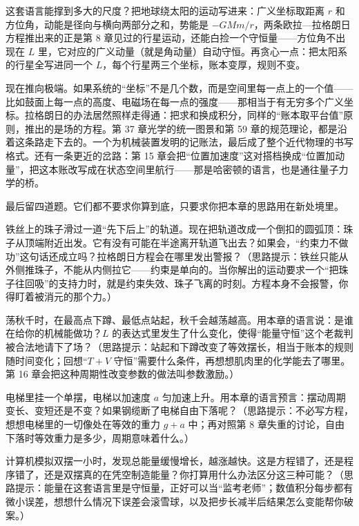 
\begin{thought}
这套语言能撑到多大的尺度？把地球绕太阳的运动写进来：广义坐标取距离 \(r\) 和方位角，动能是径向与横向两部分之和，势能是 \(-GMm/r\)，两条欧拉—拉格朗日方程推出来的正是第 8 章见过的行星运动，还能白捡一个守恒量——方位角不出现在 \(L\) 里，它对应的广义动量（就是角动量）自动守恒。再贪心一点：把太阳系的行星全写进同一个 \(L\)，每个行星两三个坐标，账本变厚，规则不变。

现在推向极端。如果系统的“坐标”不是几个数，而是空间里每一点上的一个值——比如鼓面上每一点的高度、电磁场在每一点的强度——那相当于有无穷多个广义坐标。拉格朗日的办法居然照样走得通：把求和换成积分，同样的“账本取平台值”原则，推出的是场的方程。第 37 章光学的统一图景和第 59 章的规范理论，都是沿着这条路走下去的。一个为机械装置发明的记账法，最后成了整个近代物理的书写格式。还有一条更近的岔路：第 15 章会把“位置加速度”这对搭档换成“位置加动量”，把这本账改写成在状态空间里航行——那是哈密顿的语言，也是通往量子力学的桥。
\end{thought}

\begin{mainline}
最后留四道题。它们都不要求你算到底，只要求你把本章的思路用在新处境里。
\end{mainline}

\begin{puzzles}
\item 铁丝上的珠子滑过一道“先下后上”的轨道。现在把轨道改成一个倒扣的圆弧顶：珠子从顶端附近出发。它有没有可能在半途离开轨道飞出去？如果会，“约束力不做功”这句话还成立吗？拉格朗日方程会在哪里发出警报？（思路提示：铁丝只能从外侧推珠子，不能从内侧拉它——约束是单向的。当你解出的运动要求一个“把珠子往回吸”的支持力时，就是约束失效、珠子飞离的时刻。方程本身不会报警，你得盯着被消元的那个力。）
\item 荡秋千时，在最高点下蹲、最低点站起，秋千会越荡越高。用本章的语言说：是谁在给你的机械能做功？\(L\) 的表达式里发生了什么变化，使得“能量守恒”这个老裁判被合法地请下了场？（思路提示：站起和下蹲改变了等效摆长，相当于账本的规则随时间变化；回想“\(T+V\) 守恒”需要什么条件，再想想肌肉里的化学能去了哪里。第 16 章会把这种周期性改变参数的做法叫参数激励。）
\item 电梯里挂一个单摆，电梯以加速度 \(a\) 匀加速上升。用本章的语言预言：摆动周期变长、变短还是不变？如果钢缆断了电梯自由下落呢？（思路提示：不必写方程，想想电梯里的一切像处在等效的重力 \(g+a\) 中；再对照第 8 章失重的讨论，自由下落时等效重力是多少，周期意味着什么。）
\item 计算机模拟双摆一小时，发现总能量缓慢增长，越涨越快。这是方程错了，还是程序错了，还是双摆真的在凭空制造能量？你打算用什么办法区分这三种可能？（思路提示：能量在这套语言里是守恒量，正好可以当“监考老师”；数值积分每步都有微小误差，想想什么情况下误差会滚雪球，以及把步长减半后结果怎么变能帮你破案。）
\end{puzzles}
